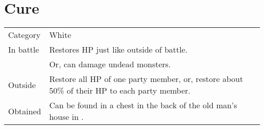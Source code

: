 \section{Cure}
\label{spell:cure}


\noindent\begin{tabularx}{\textwidth}[l]{lX}
	Category
	& White
\\
	In battle
	& Restores HP just like outside of battle. \\ 
	& Or, can damage undead monsters.
\\
	Outside
	& Restore all HP of one party member, or, restore about 50\% of their HP to each party member.
\\
	Obtained
	& Can be found in a chest in the back of the old man’s house in \nameref{map:foresta}.
\end{tabularx}
